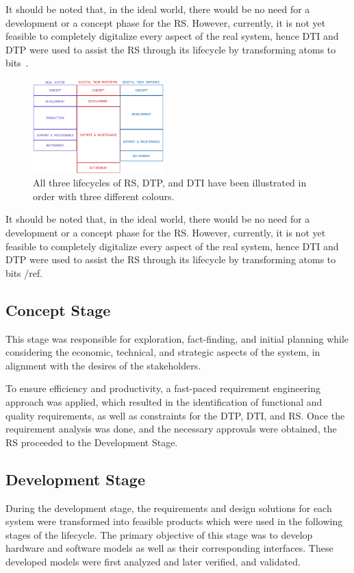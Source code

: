 \documentclass[conference]{IEEEtran}
\begin{document}
    It should be noted that, in the ideal world, there would be no need for a development or a concept phase 
    for the RS. However, currently, it is not yet feasible to completely digitalize every aspect of the real system, 
    hence DTI and DTP were used to assist the RS through its lifecycle by transforming atoms to bits~\cite{BeingDigital}.


    \begin{figure}[htbp]
        \centering
        \includegraphics[width=0.45\textwidth]{LIFECYCLE.png}
        \caption{All three lifecycles of RS, DTP, and DTI have been illustrated in order with three different colours.}\label{fig:LIFECYCLE}
    \end{figure}
    
    It should be noted that, in the ideal world, there would be no need for a development or a concept phase for the RS. However, currently, it is not yet feasible to completely digitalize every aspect of the real system,
    hence  DTI and DTP were used to assist the RS through its lifecycle by transforming atoms to bits /ref.

    \subsection{Concept Stage}
    This stage was responsible for exploration, fact-finding, and initial planning while considering the economic, technical, and strategic aspects of the system, in alignment with the desires of the stakeholders. 
    
    To ensure efficiency and productivity, a fast-paced requirement engineering approach was applied, which resulted in the identification of functional and quality requirements, 
    as well as constraints for the DTP, DTI, and RS. Once the requirement analysis was done, and the necessary approvals were obtained, the RS proceeded to the Development Stage. 
    
    \subsection{Development Stage}
    During the development stage, the requirements and design solutions for each system were transformed into feasible products which were used in the following stages of the lifecycle.
    The primary objective of this stage was to develop hardware and software models as well as their corresponding interfaces. 
    These developed models were first analyzed and later verified, and validated. 
\end{document}

